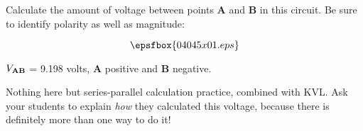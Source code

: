 

Calculate the amount of voltage between points {\bf A} and {\bf B} in this circuit.  Be sure to identify polarity as well as magnitude:

$$\epsfbox{04045x01.eps}$$







$V_{\bf AB}$ = 9.198 volts, {\bf A} positive and {\bf B} negative.







Nothing here but series-parallel calculation practice, combined with KVL.  Ask your students to explain {\it how} they calculated this voltage, because there is definitely more than one way to do it!




